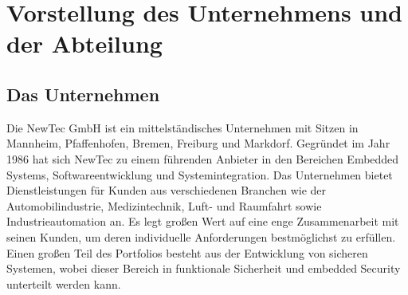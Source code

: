 \documentclass[11pt,a4paper]{report}
\newcommand{\firma}{NewTec GmbH}
\begin{document}

\begin{abstract}
Während des praktischen Studiensemesters bei der \firma wurden verschiedene Projekte behandelt, die einen umfassenden Einblick in die Welt der Softwareentwicklung geben konnten.

Zunächst wird mittels des Tools \glqq Doxygen\grqq{} aber auch den Programmiersprachen HTML, CSS und JavsScript eine moderne und benutzerfreundliche Vorlage zur Dokumentaion von Quellcode gestaltet. Neben graphischem Design werden auch dynamische Elemente wie Button implementiert.

Im zweiten Projekt wird als Teil einer Bachelorarbeit eine Schnittstelle zwischen den Office Tools MS Project und MS Excel entwickelt. Diese basiert auf den Programmiersprachen VBA und Python und soll die Vorteile beider vereinen.

Abschließend wird geprüft ob die Entwicklung und Anpassung eines lokalen Language Models (LLM) für die Generierung von Code-Dokumentation mit momentan vorhandenen Ressourcen umsetzbar ist.

Neben den aufgeführten Projekten wurde noch weitere Aufgaben durchgeführt, die auf Grund ihres geringen Umfangs keine Beachtung in diesem Bericht finden.

\end{abstract}

\tableofcontents

\chapter{Vorstellung des Unternehmens und der Abteilung} \label{chap:einf}
\section{Das Unternehmen} \label{sec::company}

Die NewTec GmbH ist ein mittelständisches Unternehmen mit Sitzen in Mannheim, Pfaffenhofen, Bremen, Freiburg und Markdorf. Gegründet im Jahr 1986 hat sich NewTec zu einem führenden Anbieter in den Bereichen Embedded Systems, Softwareentwicklung und Systemintegration. Das Unternehmen bietet Dienstleistungen für Kunden aus verschiedenen Branchen wie der Automobilindustrie, Medizintechnik, Luft- und Raumfahrt sowie Industrieautomation an. Es legt großen Wert auf eine enge Zusammenarbeit mit seinen Kunden, um deren individuelle Anforderungen bestmöglichst zu erfüllen. Einen großen Teil des Portfolios besteht aus der Entwicklung von sicheren Systemen, wobei dieser Bereich in funktionale Sicherheit und embedded Security unterteilt werden kann.
\end{document}
